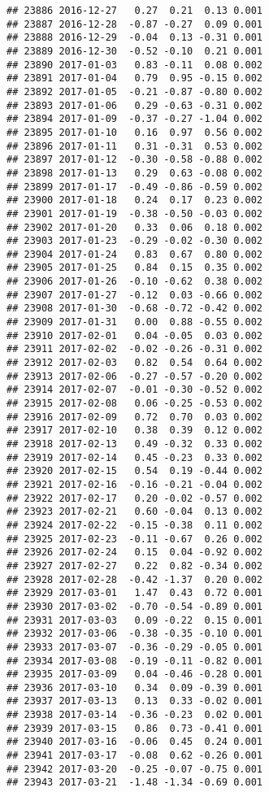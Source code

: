\documentclass[
]{article}
\begin{document}
\begin{verbatim}
## 23886 2016-12-27   0.27  0.21  0.13 0.001
## 23887 2016-12-28  -0.87 -0.27  0.09 0.001
## 23888 2016-12-29  -0.04  0.13 -0.31 0.001
## 23889 2016-12-30  -0.52 -0.10  0.21 0.001
## 23890 2017-01-03   0.83 -0.11  0.08 0.002
## 23891 2017-01-04   0.79  0.95 -0.15 0.002
## 23892 2017-01-05  -0.21 -0.87 -0.80 0.002
## 23893 2017-01-06   0.29 -0.63 -0.31 0.002
## 23894 2017-01-09  -0.37 -0.27 -1.04 0.002
## 23895 2017-01-10   0.16  0.97  0.56 0.002
## 23896 2017-01-11   0.31 -0.31  0.53 0.002
## 23897 2017-01-12  -0.30 -0.58 -0.88 0.002
## 23898 2017-01-13   0.29  0.63 -0.08 0.002
## 23899 2017-01-17  -0.49 -0.86 -0.59 0.002
## 23900 2017-01-18   0.24  0.17  0.23 0.002
## 23901 2017-01-19  -0.38 -0.50 -0.03 0.002
## 23902 2017-01-20   0.33  0.06  0.18 0.002
## 23903 2017-01-23  -0.29 -0.02 -0.30 0.002
## 23904 2017-01-24   0.83  0.67  0.80 0.002
## 23905 2017-01-25   0.84  0.15  0.35 0.002
## 23906 2017-01-26  -0.10 -0.62  0.38 0.002
## 23907 2017-01-27  -0.12  0.03 -0.66 0.002
## 23908 2017-01-30  -0.68 -0.72 -0.42 0.002
## 23909 2017-01-31   0.00  0.88 -0.55 0.002
## 23910 2017-02-01   0.04 -0.05  0.03 0.002
## 23911 2017-02-02  -0.02 -0.26 -0.31 0.002
## 23912 2017-02-03   0.82  0.54  0.64 0.002
## 23913 2017-02-06  -0.27 -0.57 -0.20 0.002
## 23914 2017-02-07  -0.01 -0.30 -0.52 0.002
## 23915 2017-02-08   0.06 -0.25 -0.53 0.002
## 23916 2017-02-09   0.72  0.70  0.03 0.002
## 23917 2017-02-10   0.38  0.39  0.12 0.002
## 23918 2017-02-13   0.49 -0.32  0.33 0.002
## 23919 2017-02-14   0.45 -0.23  0.33 0.002
## 23920 2017-02-15   0.54  0.19 -0.44 0.002
## 23921 2017-02-16  -0.16 -0.21 -0.04 0.002
## 23922 2017-02-17   0.20 -0.02 -0.57 0.002
## 23923 2017-02-21   0.60 -0.04  0.13 0.002
## 23924 2017-02-22  -0.15 -0.38  0.11 0.002
## 23925 2017-02-23  -0.11 -0.67  0.26 0.002
## 23926 2017-02-24   0.15  0.04 -0.92 0.002
## 23927 2017-02-27   0.22  0.82 -0.34 0.002
## 23928 2017-02-28  -0.42 -1.37  0.20 0.002
## 23929 2017-03-01   1.47  0.43  0.72 0.001
## 23930 2017-03-02  -0.70 -0.54 -0.89 0.001
## 23931 2017-03-03   0.09 -0.22  0.15 0.001
## 23932 2017-03-06  -0.38 -0.35 -0.10 0.001
## 23933 2017-03-07  -0.36 -0.29 -0.05 0.001
## 23934 2017-03-08  -0.19 -0.11 -0.82 0.001
## 23935 2017-03-09   0.04 -0.46 -0.28 0.001
## 23936 2017-03-10   0.34  0.09 -0.39 0.001
## 23937 2017-03-13   0.13  0.33 -0.02 0.001
## 23938 2017-03-14  -0.36 -0.23  0.02 0.001
## 23939 2017-03-15   0.86  0.73 -0.41 0.001
## 23940 2017-03-16  -0.06  0.45  0.24 0.001
## 23941 2017-03-17  -0.08  0.62 -0.26 0.001
## 23942 2017-03-20  -0.25 -0.07 -0.75 0.001
## 23943 2017-03-21  -1.48 -1.34 -0.69 0.001

\end{verbatim}
\end{document}
